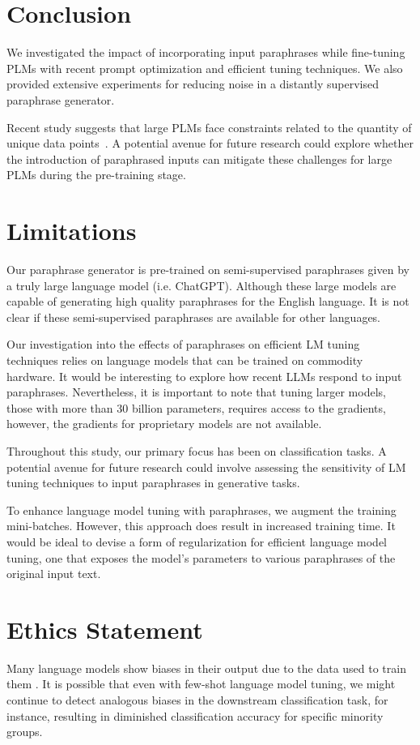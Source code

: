 \documentclass[11pt]{article}
\begin{document}
\section{Conclusion}
We investigated the impact of incorporating input paraphrases while fine-tuning PLMs with recent prompt optimization and efficient tuning techniques. We also provided extensive experiments for reducing noise in a distantly supervised paraphrase generator. 

Recent study suggests that large PLMs face constraints related to the quantity of unique data points~\cite{muennighoff2023scaling}. A potential avenue for future research could explore whether the introduction of paraphrased inputs can mitigate these challenges for large PLMs during the pre-training stage.

\section*{Limitations}
Our paraphrase generator is pre-trained on semi-supervised paraphrases given by a truly large language model (i.e. ChatGPT). Although these large models are capable of generating high quality paraphrases for the English language. It is not clear if these semi-supervised paraphrases are available for other languages.

Our investigation into the effects of paraphrases on efficient LM tuning techniques relies on language models that can be trained on commodity hardware. It would be interesting to explore how recent LLMs respond to input paraphrases. Nevertheless, it is important to note that tuning larger models, those with more than 30 billion parameters, requires access to the gradients, however, the gradients for proprietary models are not available.

Throughout this study, our primary focus has been on classification tasks. A potential avenue for future research could involve assessing the sensitivity of LM tuning techniques to input paraphrases in generative tasks.

To enhance language model tuning with paraphrases, we augment the training mini-batches. However, this approach does result in increased training time. It would be ideal to devise a form of regularization for efficient language model tuning, one that exposes the model's parameters to various paraphrases of the original input text.

\section*{Ethics Statement}
Many language models show biases in their output due to the data used to train them \cite{liang2021towards}.   It is possible that even with few-shot language model tuning, we might continue to detect analogous biases in the downstream classification task, for instance, resulting in diminished classification accuracy for specific minority groups.
\end{document}
